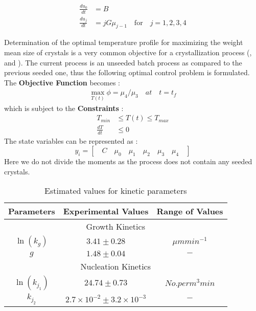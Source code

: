 \documentclass[3p,times,authoryear]{elsarticle}
\begin{document}
\begin{align} 
\frac{du_{0}}{dt} &= B  \label{ceq1} \\
\frac{du_{j}}{dt} &= jG\mu_{j-1} \label{ceq2} \quad\text{for}\quad j = 1,2,3,4
\end{align}
\par
Determination of the optimal temperature profile for maximizing the weight mean size of crystals is a very common objective for a crystallization process (\cite{mao2010kinetics}, \cite{nowee2007optimization} and \cite{yang2013model}). The current process is an unseeded batch process as compared to the previous seeded one, thus the following optimal control problem is formulated.  
The \textbf{Objective Function} becomes :
\begin{align}
\max_{T(t)}	\phi = \mu_{4}/\mu_{3} \quad at \quad t = t_{f} 
\end{align}
which is subject to the \textbf{Constraints} : 
\begin{align}
T_{min} &\leqslant T(t) \leqslant T_{max} \\
\frac{dT}{dt} &\leqslant 0
\end{align}
The state variables can be represented as :
\begin{equation*}
y_{i} = \left[\quad C \quad \mu_{0} \quad \mu_{1} \quad \mu_{2} \quad \mu_{3}\quad \mu_{4} \quad\right]  
\end{equation*}
Here we do not divide the moments as the process does not contain any seeded crystals.


\begin{center}
\begin{table}[!h]
\centering 
\caption{Estimated values for kinetic parameters} \label{Table4}
\begin{tabular}{|c|c|c|}
\hline
Parameters & Experimental Values & Range of Values\\
\hline
\multicolumn{3}{|c|}{Growth Kinetics} \\
\hline
$\ln(k_{g})$ & $3.41\pm 0.28$ & $\mu m min^{-1} $\\
$g$ & $1.48\pm 0.04$ & $ - $\\
\hline
\multicolumn{3}{|c|}{Nucleation Kinetics} \\
\hline
$\ln(k_{j_{1}})$ & $24.74\pm0.73$ & $No. per m^{3}min$\\ 
$k_{j_{2}}$ & $2.7\times10^{-2}\pm 3.2\times10^{-3}$ & $-$\\
\hline
\end{tabular}

\label{values}
\end{table}
\end{center}
\end{document}
